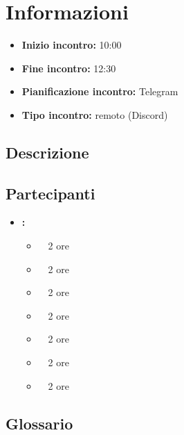 \section{Informazioni}
\begin{itemize}
	\item \textbf{Inizio incontro:} 10:00
	\item \textbf{Fine incontro:} 12:30
	\item \textbf{Pianificazione incontro:} Telegram
	\item \textbf{Tipo incontro:} remoto (Discord)
\end{itemize}

\subsection{Descrizione}
\DocDescription

\subsection{Partecipanti}

\begin{itemize}
	\item \textbf{\GroupName:}
	\begin{itemize}
		\item \tommaso \ \rightarrow\ 2 ore
		\item \marco \ \rightarrow\ 2 ore
		\item \raul \ \rightarrow\ 2 ore
		\item \sebastiano \ \rightarrow\ 2 ore
		\item \martina \ \rightarrow\ 2 ore
		\item \riccardo \ \rightarrow\ 2 ore
		\item \mattia \ \rightarrow\  2 ore
	\end{itemize}
\end{itemize}

\subsection{Glossario}
\GlossarioIntroduzione

\clearpage